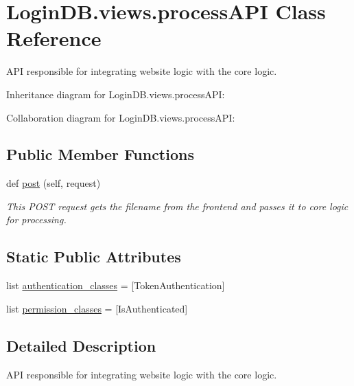 \hypertarget{class_login_d_b_1_1views_1_1process_a_p_i}{}\section{Login\+D\+B.\+views.\+process\+A\+PI Class Reference}
\label{class_login_d_b_1_1views_1_1process_a_p_i}


A\+PI responsible for integrating website logic with the core logic.  




Inheritance diagram for Login\+D\+B.\+views.\+process\+A\+PI\+:


Collaboration diagram for Login\+D\+B.\+views.\+process\+A\+PI\+:
\subsection*{Public Member Functions}
\begin{DoxyCompactItemize}
\item 
def \hyperlink{class_login_d_b_1_1views_1_1process_a_p_i_abf9247305b4cc3b1a22dbdb2e8a30d38}{post} (self, request)
\begin{DoxyCompactList}\small\item\em This P\+O\+ST request gets the filename from the frontend and passes it to core logic for processing. \end{DoxyCompactList}\end{DoxyCompactItemize}
\subsection*{Static Public Attributes}
\begin{DoxyCompactItemize}
\item 
list \hyperlink{class_login_d_b_1_1views_1_1process_a_p_i_a0c949077031dc342e5763bb8dfdefcd4}{authentication\+\_\+classes} = \mbox{[}Token\+Authentication\mbox{]}
\item 
list \hyperlink{class_login_d_b_1_1views_1_1process_a_p_i_a0e1bfc642be133c0206645511cbfc8b2}{permission\+\_\+classes} = \mbox{[}Is\+Authenticated\mbox{]}
\end{DoxyCompactItemize}


\subsection{Detailed Description}
A\+PI responsible for integrating website logic with the core logic. 

